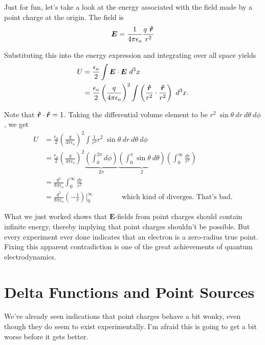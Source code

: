 \documentclass{article}
\begin{document}
Just for fun, let's take a look at the energy associated with the field made by a point charge at the origin. The field is
\begin{equation*}
    \bm{E} = \frac{1}{4\pi\epsilon_o} \frac{q\ \rhat}{r^2}
\end{equation*}

Substituting this into the energy expression and integrating over all space yields
\begin{align*}
    U &= \frac{\epsilon_o}{2} \int \bm{E} \cdot \bm{E}\ d^3x \\
    &= \frac{\epsilon_o}{2} \left( \frac{q}{4\pi\epsilon_o} \right)^2 \int \left( \frac{\rhat}{r^2} \cdot \frac{\rhat}{r^2} \right)\ d^3x.
\end{align*}

Note that $\bm{\hat{r}} \cdot \bm{\hat{r}} = 1$. Taking the differential volume element to be $r^2\ \sin{\theta}\ dr\ d\theta\ d\phi$, we get
\begin{align*}
    U &= \frac{\epsilon_o}{2} \left( \frac{q}{4\pi\epsilon_o} \right)^2 \int \frac{1}{r^4} r^2\ \sin{\theta}\ dr\ d\theta\ d\phi \\
    &= \frac{\epsilon_o}{2} \left( \frac{q}{4\pi\epsilon_o} \right)^2 \underbrace{\left( \int_0^{2\pi} d\phi \right)}_{\displaystyle 2\pi} \underbrace{\left( \int_0^{\pi} \sin{\theta}\ d\theta \right)}_{\displaystyle 2} \left( \int_0^{\infty} \frac{dr}{r^2} \right) \\
    &= \frac{q^2}{8\pi\epsilon_o} \int_0^{\infty} \frac{dr}{r^2} \\
    &= \frac{q^2}{8\pi\epsilon_o} \left( -\frac{1}{r} \right)\bigg|_{0}^{\infty} \qquad\qquad \text{which kind of diverges. That's bad.}
\end{align*}

What we just worked shows that $\bm{E}$-fields from point charges should contain infinite energy, thereby implying that point charges shouldn't be possible. But every experiment ever done indicates that an electron is a zero-radius true point. Fixing this apparent contradiction is one of the great achievements of quantum electrodynamics.

\section*{Delta Functions and Point Sources}

We've already seen indications that point charges behave a bit wonky, even though they do seem to exist experimentally. I'm afraid this is going to get a bit worse before it gets better.
\end{document}
